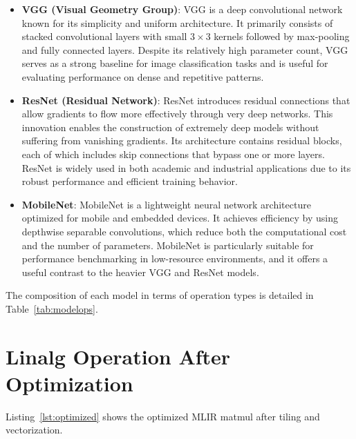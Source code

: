 \documentclass[10pt,twocolumn]{article}
\begin{document}
\begin{itemize}
\item \textbf{VGG (Visual Geometry Group)}: VGG is a deep convolutional network known for its simplicity and uniform architecture. It primarily consists of stacked convolutional layers with small $3 \times 3$ kernels followed by max-pooling and fully connected layers. Despite its relatively high parameter count, VGG serves as a strong baseline for image classification tasks and is useful for evaluating performance on dense and repetitive patterns.
\item \textbf{ResNet (Residual Network)}: ResNet introduces residual connections that allow gradients to flow more effectively through very deep networks. This innovation enables the construction of extremely deep models without suffering from vanishing gradients. Its architecture contains residual blocks, each of which includes skip connections that bypass one or more layers. ResNet is widely used in both academic and industrial applications due to its robust performance and efficient training behavior.
\item \textbf{MobileNet}: MobileNet is a lightweight neural network architecture optimized for mobile and embedded devices. It achieves efficiency by using depthwise separable convolutions, which reduce both the computational cost and the number of parameters. MobileNet is particularly suitable for performance benchmarking in low-resource environments, and it offers a useful contrast to the heavier VGG and ResNet models.
\end{itemize}

The composition of each model in terms of operation types is detailed in Table~\ref{tab:modelops}.

\section{Linalg Operation After Optimization}

Listing~\ref{lst:optimized} shows the optimized MLIR matmul after tiling and vectorization.
\end{document}
